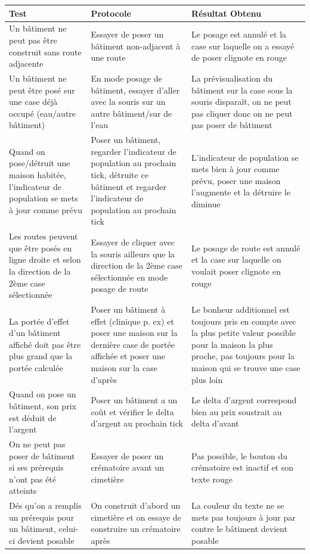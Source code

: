 \documentclass[a4paper,10pt,openany,oneside]{report}
\begin{document}
\begin{center}
	\begin{tabular}{| p{3cm} | p{6cm} | p{6cm} |}
	\hline
		 \textbf{Test} & \textbf{Protocole} & \textbf{Résultat Obtenu}
		 \\ \hline Un bâtiment ne peut pas être construit sans route adjacente & Essayer de poser un bâtiment non-adjacent à une route & Le posage est annulé et la case sur laquelle on a essayé de poser clignote en rouge
		\\ \hline Un bâtiment ne peut être posé sur une case déjà occupé (eau/autre bâtiment) & En mode posage de bâtiment, essayer d'aller avec la souris sur un autre bâtiment/sur de l'eau & La prévisualisation du bâtiment sur la case sous la souris disparaît, on ne peut pas cliquer donc on ne peut pas poser de bâtiment
		\\ \hline Quand on pose/détruit une maison habitée, l'indicateur de population se mets à jour comme prévu & Poser un bâtiment, regarder l'indicateur de population au prochain tick, détruite ce bâtiment et regarder l'indicateur de population au prochain tick & L'indicateur de population se mets bien à jour comme prévu, poser une maison l'augmente et la détruire le diminue
		\\ \hline Les routes peuvent que être posés en ligne droite et selon la direction de la 2ème case sélectionnée & Essayer de cliquer avec la souris ailleurs que la direction de la 2ème case sélectionnée en mode posage de route & Le posage de route est annulé et la case sur laquelle on voulait poser clignote en rouge
		\\ \hline La portée d'effet d'un bâtiment affiché doit pas être plus grand que la portée calculée & Poser un bâtiment à effet (clinique p. ex) et poser une maison sur la dernière case de portée affichée et poser une maison sur la case d'après & Le bonheur additionnel est toujours pris en compte avec la plus petite valeur possible pour la maison la plus proche, pas toujours pour la maison qui se trouve une case plus loin
		\\ \hline Quand on pose un bâtiment, son prix est déduit de l'argent & Poser un bâtiment a un coût et vérifier le delta d'argent au prochain tick & Le delta d'argent correspond bien au prix soustrait au delta d'avant
		\\ \hline On ne peut pas poser de bâtiment si ses prérequis n'ont pas été atteints & Essayer de poser un crématoire avant un cimetière & Pas possible, le bouton du crématoire est inactif et son texte rouge
		\\ \hline Dés qu'on a remplis un prérequis pour un bâtiment, celui-ci devient posable & On construit d'abord un cimetière et on essaye de construire un crématoire après & La couleur du texte ne se mets pas toujours à jour par contre le bâtiment devient posable

\end{tabular}
\end{center}
\end{document}
